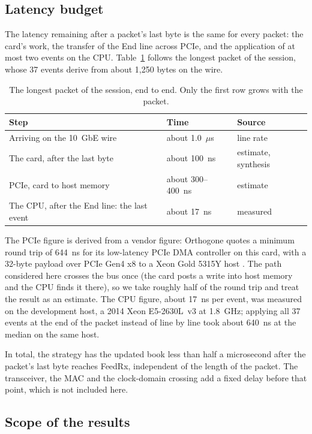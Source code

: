 \documentclass[11pt]{article}
\begin{document}
\subsection{Latency budget}
\label{sec:budget}

The latency remaining after a packet's last byte is the same for every packet:
the card's work, the transfer of the End line across PCIe, and the application
of at most two events on the CPU. Table~\ref{tab:budget} follows the longest
packet of the session, whose 37 events derive from about 1{,}250 bytes on the
wire.

\begin{table}[h]
\centering
\caption{The longest packet of the session, end to end. Only the first row
grows with the packet.}
\label{tab:budget}
\small
\begin{tabular}{p{6.4cm} p{4.0cm} p{2.4cm}}
\toprule
Step & Time & Source \\
\midrule
Arriving on the 10~GbE wire & about 1.0~$\mu$s & line rate \\
The card, after the last byte & about 100~ns & estimate, synthesis \\
PCIe, card to host memory & about 300--400~ns & estimate \\
The CPU, after the End line: the last event & about 17~ns & measured \\
\bottomrule
\end{tabular}
\end{table}

The PCIe figure is derived from a vendor figure: Orthogone quotes a minimum
round trip of 644~ns for its low-latency PCIe DMA controller on this card, with
a 32-byte payload over PCIe Gen4 x8 to a Xeon Gold 5315Y host
\cite{orthogone2023}. The path considered here crosses the bus once (the card
posts a write into host memory and the CPU finds it there), so we take roughly
half of the round trip and treat the result as an
estimate. The CPU figure, about 17~ns per event, was
measured on the development host, a 2014 Xeon E5-2630L~v3 at 1.8~GHz; applying
all 37 events at the end of the packet instead of line by line took about
640~ns at the median on the same host.

In total, the strategy has the updated book less than half a microsecond after
the packet's last byte reaches FeedRx, independent of the length of the packet.
The transceiver, the MAC and the clock-domain crossing add a fixed delay before
that point, which is not included here.

\subsection{Scope of the results}
\label{sec:limits}
\end{document}
